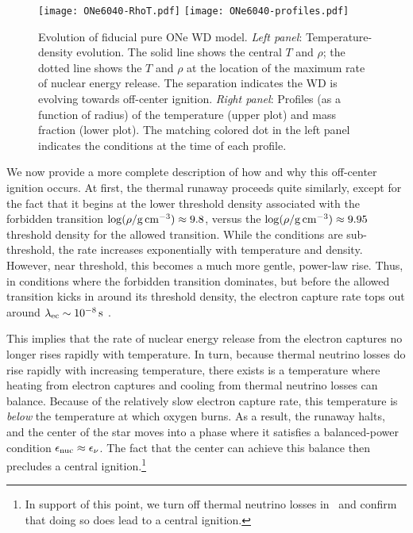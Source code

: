 \documentclass[modern]{aastex62}
\begin{document}
\begin{figure}
  \centering
  \texttt{[image: ONe6040-RhoT.pdf]}
  \texttt{[image: ONe6040-profiles.pdf]}
  \caption{Evolution of fiducial pure ONe WD model.  \textit{Left
      panel}: Temperature-density evolution.  The solid line shows the
    central $T$ and $\rho$; the dotted line shows the $T$ and $\rho$
    at the location of the maximum rate of nuclear energy release.
    The separation indicates the WD is evolving towards off-center
    ignition.  \textit{Right panel}: Profiles (as a function of
    radius) of the temperature (upper plot) and \neon[20] mass
    fraction (lower plot).  The matching colored dot in the left panel
    indicates the conditions at the time of each profile.}
  \label{fig:ONe6040}
\end{figure}


We now provide a more complete description of how and why this
off-center ignition occurs.  At first, the \neon[20] thermal runaway
proceeds quite similarly, except for the fact that it begins at the
lower threshold density associated with the forbidden transition
$\log(\rho/\mathrm{g\,cm^{-3}}) \approx 9.8$, versus the $\log(\rho/\mathrm{g\,cm^{-3}}) \approx 9.95$ threshold
density for the allowed transition.  While the conditions are
sub-threshold, the rate increases exponentially with temperature and
density.  However, near threshold, this becomes a much more gentle,
power-law rise.  Thus, in conditions where the forbidden transition
dominates, but before the allowed transition kicks in around its
threshold density, the electron capture rate tops out around
$\lambda_{\rm ec} \sim \unit[10^{-8}]{s}$ \citep[see Figure 1 in
][]{MartinezPinedo2014}.


This implies that the rate of nuclear energy release from the
\neon[20] electron captures no longer rises rapidly with temperature.
In turn, because thermal neutrino losses do rise rapidly with
increasing temperature, there exists is a temperature where heating
from electron captures and cooling from thermal neutrino losses can
balance.  Because of the relatively slow electron capture rate, this
temperature is \textit{below} the temperature at which oxygen burns.
As a result, the runaway halts, and the center of the star moves into
a phase where it satisfies a balanced-power condition
$\epsilon_{\mathrm{nuc}} \approx \epsilon_{\nu}$.  The fact that the center can achieve this
balance then precludes a central ignition.\footnote{In support of this
  point, we turn off thermal neutrino losses in \MESA\ and confirm
  that doing so does lead to a central ignition.}
\end{document}
